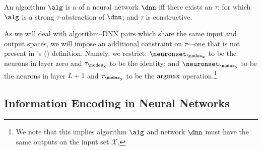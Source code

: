 \documentclass{article}
\newcommand{\citeposs}[1]{\citeauthor{#1}'s (\citeyear{#1})}
\newcommand{\bx}{\mathbf{x}}
\newcommand{\calX}{\mathcal{X}}
\newcommand{\by}{\mathbf{y}}
\newcommand{\nodesinput}{\nodes_{\bx}}
\newcommand{\nodesoutput}{\nodes_{\by}}
\newcommand{\nlayers}{L}
\newcommand{\abstractionmap}{\tau}
\begin{document}
\begin{definition}
An algorithm $\alg$ is a  of a neural network $\dnn$ iff there exists an $\abstractionmap$:
for which $\alg$ is a strong $\abstractionmap$-abstraction of $\dnn$;
and $\abstractionmap$ is constructive.
\end{definition}

As we will deal with algorithm--DNN pairs which share the same input and output spaces, we will impose an additional constraint on $\abstractionmap$---one that is not present in \citeposs{Beckers2018AbstractingCM} definition.
Namely, we restrict: $\neuronset_{\nodesinput}$ to be the neurons in layer zero and $\abstractionmap_{\nodesinput}$ to be the identity; and $\neuronset_{\nodesoutput}$ to be the neurons in layer $\nlayers+1$ and $\abstractionmap_{\nodesoutput}$ to be the $\operatorname*{argmax}$ operation.\footnote{We note that this implies algorithm $\alg$ and network $\dnn$ must have the same outputs on the input set $\calX$.}

\subsection{Information Encoding in Neural Networks}
\label{sec:Information_encoding_in_dnns}
\end{document}
